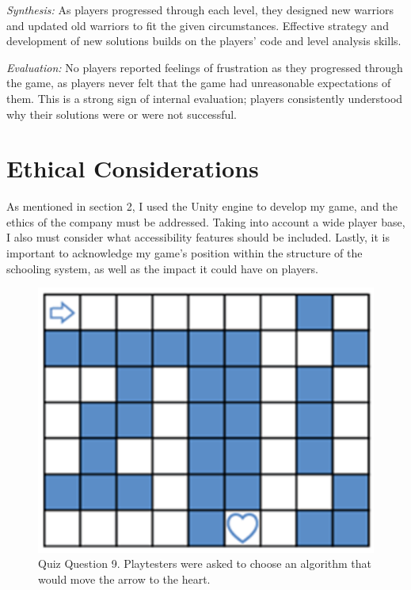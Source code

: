 \documentclass[10pt,twocolumn]{article}
\begin{document}
\textit{Synthesis:} As players progressed through each level, they designed new warriors and updated old warriors to fit the given circumstances. Effective strategy and development of new solutions builds on the players’ code and level analysis skills.

\textit{Evaluation:} No players reported feelings of frustration as they progressed through the game, as players never felt that the game had unreasonable expectations of them. This is a strong sign of internal evaluation; players consistently understood why their solutions were or were not successful.


\section{Ethical Considerations}
 As mentioned in section 2, I used the Unity engine to develop my game, and the ethics of the company must be addressed. Taking into account a wide player base, I also must consider what accessibility features should be included. Lastly, it is important to acknowledge my game’s position within the structure of the schooling system, as well as the impact it could have on players.

 \begin{figure}
    \centering
    \includegraphics[width=0.5\linewidth]{images/move-robot.png}
    \caption{Quiz Question 9. Playtesters were asked to choose an algorithm that would move the arrow to the heart.}
    \label{fig:question-9}
\end{figure}
\end{document}
